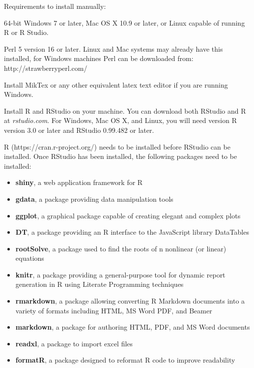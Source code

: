 \documentclass[conference]{IEEEtran}
\begin{document}
Requirements to install manually:
\begin{itemize}%
  \item {64-bit Windows 7 or later, Mac OS X 10.9 or later, or Linux capable of running R or R Studio.}
  \item {Perl 5 version 16 or later. Linux and Mac systems may already have this installed, for Windows machines Perl can be downloaded from: http://strawberryperl.com/}
  \item{Install MikTex or any other equivalent latex text editor if you are running Windows.}
  \item {Install R and RStudio on your machine. You can download both RStudio and R at \textit{rstudio.com}. For Windows, Mac OS X, and Linux, you will need version R version 3.0 or later and RStudio 0.99.482 or later.
  \item {R (https://cran.r-project.org/) needs to be installed before RStudio can be installed. Once RStudio has been installed, the following packages need to be installed:
        \begin{itemize}
          \item {\textbf{shiny}, a web application framework for R}
          \item {\textbf{gdata}, a package providing data manipulation tools}
          \item {\textbf{ggplot}, a graphical package capable of creating elegant and complex plots}
          \item {\textbf{DT}, a package providing an R interface to the JavaScript library DataTables}
          \item {\textbf{rootSolve}, a package used to find the roots of n nonlinear (or linear) equations}
          \item {\textbf{knitr}, a package providing a general-purpose tool for dynamic report generation in R using Literate Programming techniques}
          \item {\textbf{rmarkdown}, a package allowing converting R Markdown documents into a variety of formats including HTML, MS Word PDF, and Beamer}
          \item {\textbf{markdown}, a package for authoring HTML, PDF, and MS Word documents}
          \item {\textbf{readxl}, a package to import excel files}
          \item {\textbf{formatR}, a package designed to reformat R code to improve readability}
        \end{itemize}
}}
\end{itemize}
\end{document}
